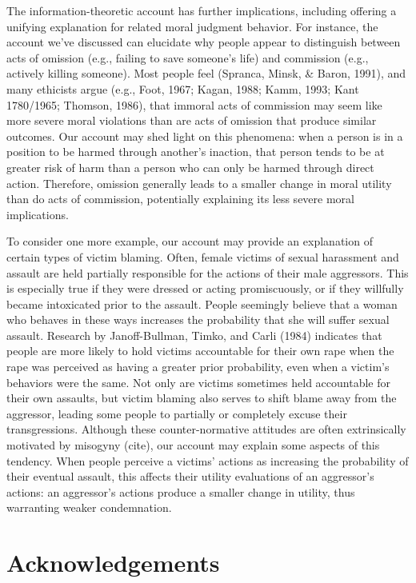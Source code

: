 \documentclass[12pt,]{article}
\begin{document}
The information-theoretic account has further implications, including
offering a unifying explanation for related moral judgment behavior. For
instance, the account we've discussed can elucidate why people appear to
distinguish between acts of omission (e.g., failing to save someone's
life) and commission (e.g., actively killing someone). Most people feel
(Spranca, Minsk, \& Baron, 1991), and many ethicists argue (e.g., Foot,
1967; Kagan, 1988; Kamm, 1993; Kant 1780/1965; Thomson, 1986), that
immoral acts of commission may seem like more severe moral violations
than are acts of omission that produce similar outcomes. Our account may
shed light on this phenomena: when a person is in a position to be
harmed through another's inaction, that person tends to be at greater
risk of harm than a person who can only be harmed through direct action.
Therefore, omission generally leads to a smaller change in moral utility
than do acts of commission, potentially explaining its less severe moral
implications.

To consider one more example, our account may provide an explanation of
certain types of victim blaming. Often, female victims of sexual
harassment and assault are held partially responsible for the actions of
their male aggressors. This is especially true if they were dressed or
acting promiscuously, or if they willfully became intoxicated prior to
the assault. People seemingly believe that a woman who behaves in these
ways increases the probability that she will suffer sexual assault.
Research by Janoff-Bullman, Timko, and Carli (1984) indicates that
people are more likely to hold victims accountable for their own rape
when the rape was perceived as having a greater prior probability, even
when a victim's behaviors were the same. Not only are victims sometimes
held accountable for their own assaults, but victim blaming also serves
to shift blame away from the aggressor, leading some people to partially
or completely excuse their transgressions. Although these
counter-normative attitudes are often extrinsically motivated by
misogyny (cite), our account may explain some aspects of this tendency.
When people perceive a victims' actions as increasing the probability of
their eventual assault, this affects their utility evaluations of an
aggressor's actions: an aggressor's actions produce a smaller change in
utility, thus warranting weaker condemnation.

\section{Acknowledgements}\label{acknowledgements}
\end{document}
